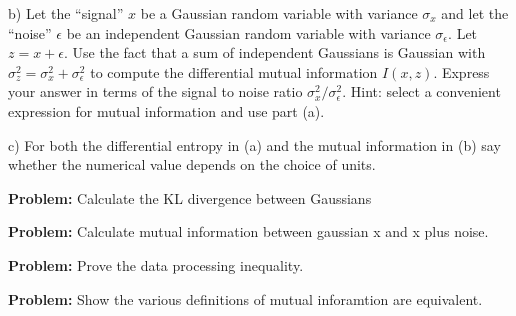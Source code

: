 \documentclass{article}
\newcommand{\solution}[1]{}
\begin{document}
b) Let the ``signal'' $x$ be a Gaussian random variable with variance $\sigma_x$ and let the ``noise'' $\epsilon$ be an independent Gaussian random variable with
variance $\sigma_\epsilon$.  Let $z = x + \epsilon$.  Use the fact that a sum of independent Gaussians is Gaussian with $\sigma^2_z = \sigma^2_x + \sigma^2_\epsilon$
to compute the differential mutual information $I(x,z)$.  Express your answer in terms of the signal to noise ratio $\sigma^2_x/\sigma^2_\epsilon$.
Hint: select a convenient expression for mutual information and use part (a).

\solution{
\begin{eqnarray*}
I(z,x) & = & H(z) - H(z|x) \\
\\
& = & \ln (\sigma^2_x + \sigma^2_\epsilon) - \ln \sigma^2_\epsilon \\
\\
& = & \ln \left(\frac{\sigma^2_x + \sigma^2_\epsilon}{\sigma^2_\epsilon}\right) \\
\\
& = & \ln \left(1 + \frac{\sigma^2_x}{\sigma^2_\epsilon} \right)
\end{eqnarray*}
}

c)  For both the differential entropy in (a) and the mutual information in (b) say whether the numerical value depends on the choice of units.

\solution{
          The numerical value of differential entropy is sensitive to the units we choose for $\sigma$.  As long as $\sigma_x$ and $\sigma_\epsilon$
          are measured in the same units, the numerical value of the mutual information is units-independent. This is consistent with the fact
          that differential entropy is not directly meaningful while mutual information can be written as a KL-divergence and differential KL-divergence
          is meaningful.
          }

\bigskip
{\bf Problem:} Calculate the KL divergence between Gaussians

\bigskip
{\bf Problem:} Calculate mutual information between gaussian x and x plus noise.

\bigskip
{\bf Problem:} Prove the data processing inequality.

\bigskip
{\bf Problem:} Show the various definitions of mutual inforamtion are equivalent.

  
\end{document}
